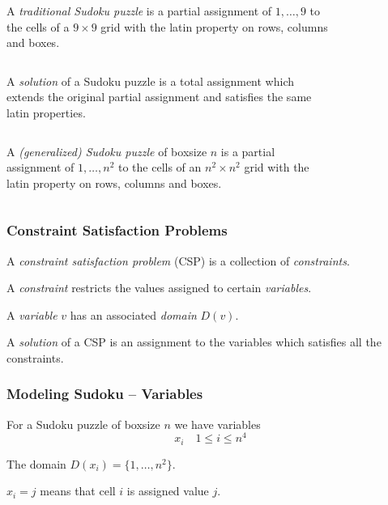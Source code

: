\documentclass{beamer}
\begin{document}
\begin{frame}
 \begin{columns}[c] 
   A \emph{traditional Sudoku puzzle} is a partial assignment of $1,\dots,9$ to the cells of a $9\times 9$ grid with the latin property on rows, columns and boxes.
   \begin{figure}[h]
    \centering
    \sudokuexampleone
   \end{figure} 
 \end{columns}
\end{frame}

\begin{frame}
 \begin{columns}[c] 
   A \emph{solution} of a Sudoku puzzle is a total assignment which extends the original partial assignment and satisfies the same latin properties.
   \begin{figure}[h]
    \centering
    \sudokuexampletwo
   \end{figure} 
 \end{columns}
\end{frame}

\begin{frame}
 \begin{columns}[c]
   A \emph{(generalized) Sudoku puzzle} of boxsize $n$ is a partial assignment of $1,\dots,n^2$ to the cells of an $n^2\times n^2$ grid with the latin property on rows, columns and boxes.
   \begin{figure}[h]
    \centering
    \sudokuexampleone
   \end{figure} 
 \end{columns}
\end{frame}

\begin{frame}[fragile]
\frametitle{Constraint Satisfaction Problems}
A \emph{constraint satisfaction problem} (CSP) is a collection of \emph{constraints}. 
\pause 

A \emph{constraint} restricts the values assigned to certain \emph{variables}.
\pause 

A \emph{variable} $v$ has an associated \emph{domain} $D(v)$.
\pause

A \emph{solution} of a CSP is an assignment to the variables which satisfies all the constraints.
\end{frame}

\begin{frame}[fragile]
\frametitle{Modeling Sudoku -- Variables}

For a Sudoku puzzle of boxsize $n$ we have variables 
\[x_i  \quad 1 \leq i \leq n^4\]

The domain $D(x_i) = \{1,\ldots,n^2\}$.

$x_i = j$ means that cell $i$ is assigned value $j$.

\end{frame}
\end{document}
